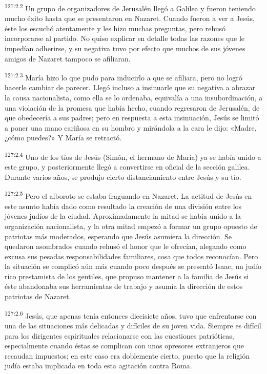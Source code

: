 \par 
\textsuperscript{127:2.2} Un grupo de organizadores de Jerusalén llegó a Galilea y fueron teniendo mucho éxito hasta que se presentaron en Nazaret. Cuando fueron a ver a Jesús, éste los escuchó atentamente y les hizo muchas preguntas, pero rehusó incorporarse al partido. No quiso explicar en detalle todas las razones que le impedían adherirse, y su negativa tuvo por efecto que muchos de sus jóvenes amigos de Nazaret tampoco se afiliaran.

\par 
\textsuperscript{127:2.3} María hizo lo que pudo para inducirlo a que se afiliara, pero no logró hacerle cambiar de parecer. Llegó incluso a insinuarle que su negativa a abrazar la causa nacionalista, como ella se lo ordenaba, equivalía a una insubordinación, a una violación de la promesa que había hecho, cuando regresaron de Jerusalén, de que obedecería a sus padres; pero en respuesta a esta insinuación, Jesús se limitó a poner una mano cariñosa en su hombro y mirándola a la cara le dijo: «Madre, ¿cómo puedes?» Y María se retractó.

\par 
\textsuperscript{127:2.4} Uno de los tíos de Jesús (Simón, el hermano de María) ya se había unido a este grupo, y posteriormente llegó a convertirse en oficial de la sección galilea. Durante varios años, se produjo cierto distanciamiento entre Jesús y su tío.

\par 
\textsuperscript{127:2.5} Pero el alboroto se estaba fraguando en Nazaret. La actitud de Jesús en este asunto había dado como resultado la creación de una división entre los jóvenes judíos de la ciudad. Aproximadamente la mitad se había unido a la organización nacionalista, y la otra mitad empezó a formar un grupo opuesto de patriotas más moderados, esperando que Jesús asumiera la dirección. Se quedaron asombrados cuando rehusó el honor que le ofrecían, alegando como excusa sus pesadas responsabilidades familiares, cosa que todos reconocían. Pero la situación se complicó aún más cuando poco después se presentó Isaac, un judío rico prestamista de los gentiles, que propuso mantener a la familia de Jesús si éste abandonaba sus herramientas de trabajo y asumía la dirección de estos patriotas de Nazaret.

\par 
\textsuperscript{127:2.6} Jesús, que apenas tenía entonces diecisiete años, tuvo que enfrentarse con una de las situaciones más delicadas y difíciles de su joven vida. Siempre es difícil para los dirigentes espirituales relacionarse con las cuestiones patrióticas, especialmente cuando éstas se complican con unos opresores extranjeros que recaudan impuestos; en este caso era doblemente cierto, puesto que la religión judía estaba implicada en toda esta agitación contra Roma.

